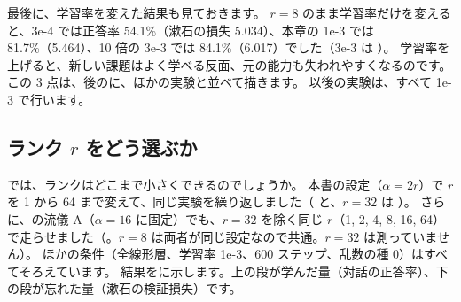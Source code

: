 最後に、学習率を変えた結果も見ておきます。
$r=8$ のまま学習率だけを変えると、3e-4 では正答率 54.1\%（漱石の損失 5.034）、本章の 1e-3 では 81.7\%（5.464）、10 倍の 3e-3 では 84.1\%（6.017）でした（3e-3 は ）。
学習率を上げると、新しい課題はよく学べる反面、元の能力も失われやすくなるのです。
この 3 点は、後のに、ほかの実験と並べて描きます。
以後の実験は、すべて 1e-3 で行います。

\subsection{ランク $r$ をどう選ぶか}\label{sec:lora-exp-rank}

では、ランクはどこまで小さくできるのでしょうか。
本書の設定（$\alpha=2r$）で $r$ を 1 から 64 まで変えて、同じ実験を繰り返しました（ と、$r=32$ は ）。
さらに、の流儀 A（$\alpha=16$ に固定）でも、$r=32$ を除く同じ $r$（1, 2, 4, 8, 16, 64）で走らせました（。$r=8$ は両者が同じ設定なので共通。$r=32$ は測っていません）。
ほかの条件（全線形層、学習率 1e-3、600 ステップ、乱数の種 0）はすべてそろえています。
結果をに示します。上の段が学んだ量（対話の正答率）、下の段が忘れた量（漱石の検証損失）です。

